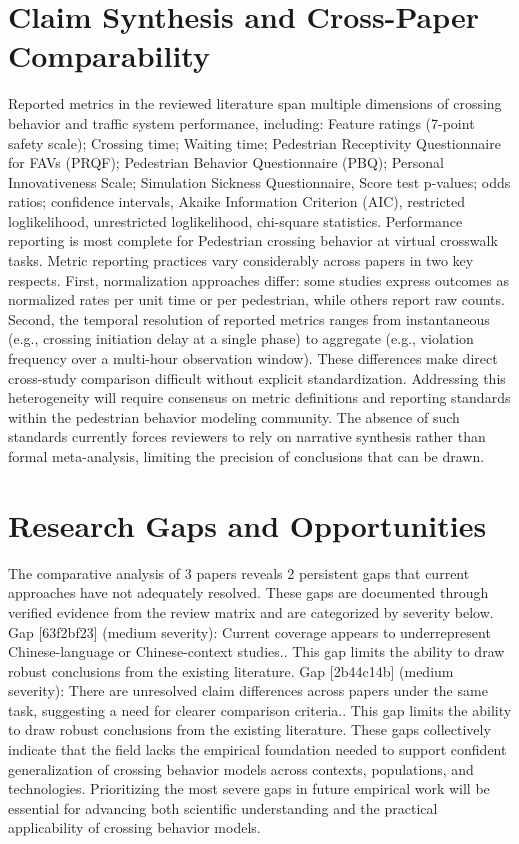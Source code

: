 \documentclass{article}
\begin{document}
\section{Claim Synthesis and Cross-Paper Comparability}
Reported metrics in the reviewed literature span multiple dimensions of crossing behavior and traffic system performance, including: Feature ratings (7-point safety scale); Crossing time; Waiting time; Pedestrian Receptivity Questionnaire for FAVs (PRQF); Pedestrian Behavior Questionnaire (PBQ); Personal Innovativeness Scale; Simulation Sickness Questionnaire, Score test p-values; odds ratios; confidence intervals, Akaike Information Criterion (AIC), restricted loglikelihood, unrestricted loglikelihood, chi-square statistics. Performance reporting is most complete for Pedestrian crossing behavior at virtual crosswalk tasks. Metric reporting practices vary considerably across papers in two key respects. First, normalization approaches differ: some studies express outcomes as normalized rates per unit time or per pedestrian, while others report raw counts. Second, the temporal resolution of reported metrics ranges from instantaneous (e.g., crossing initiation delay at a single phase) to aggregate (e.g., violation frequency over a multi-hour observation window). These differences make direct cross-study comparison difficult without explicit standardization. Addressing this heterogeneity will require consensus on metric definitions and reporting standards within the pedestrian behavior modeling community. The absence of such standards currently forces reviewers to rely on narrative synthesis rather than formal meta-analysis, limiting the precision of conclusions that can be drawn.

\section{Research Gaps and Opportunities}
The comparative analysis of 3 papers reveals 2 persistent gaps that current approaches have not adequately resolved. These gaps are documented through verified evidence from the review matrix and are categorized by severity below. Gap [63f2bf23] (medium severity): Current coverage appears to underrepresent Chinese-language or Chinese-context studies.. This gap limits the ability to draw robust conclusions from the existing literature. Gap [2b44c14b] (medium severity): There are unresolved claim differences across papers under the same task, suggesting a need for clearer comparison criteria.. This gap limits the ability to draw robust conclusions from the existing literature. These gaps collectively indicate that the field lacks the empirical foundation needed to support confident generalization of crossing behavior models across contexts, populations, and technologies. Prioritizing the most severe gaps in future empirical work will be essential for advancing both scientific understanding and the practical applicability of crossing behavior models.
\end{document}
